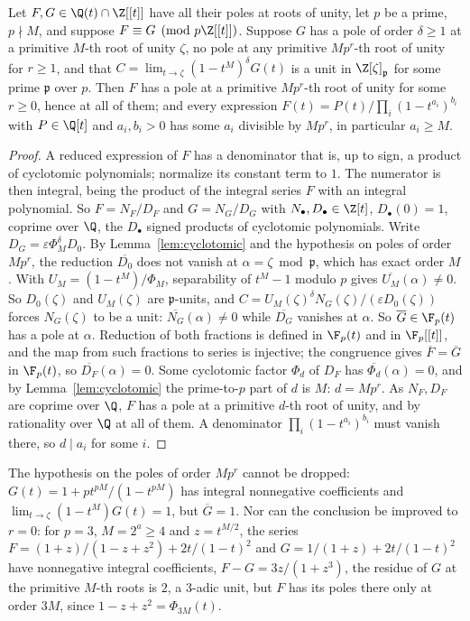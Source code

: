 \begin{theorem}\label{thm:transfer}
Let $F,G\in\Q(t)\cap\Z[[t]]$ have all their poles at roots of unity, let $p$ be
a prime, $p\nmid M$, and suppose $F\equiv G\pmod{p\Z[[t]]}$. Suppose $G$ has a
pole of order $\delta\ge1$ at a primitive $M$-th root of unity $\zeta$, no pole
at any primitive $Mp^r$-th root of unity for $r\ge1$, and that
$C=\lim_{t\to\zeta}(1-t^M)^\delta G(t)$ is a unit in $\Z[\zeta]_{\mathfrak p}$
for some prime $\mathfrak p$ over $p$. Then $F$ has a pole at a primitive
$Mp^r$-th root of unity for some $r\ge0$, hence at all of them; and every
expression $F(t)=P(t)/\prod_i(1-t^{a_i})^{b_i}$ with $P\in\Q[t]$ and $a_i,b_i>0$
has some $a_i$ divisible by $Mp^r$, in particular $a_i\ge M$.
\end{theorem}

\begin{proof}
A reduced expression of $F$ has a denominator that is, up to sign, a product
of cyclotomic polynomials; normalize its constant term to $1$. The numerator is
then integral, being the product of the integral series $F$ with an integral
polynomial. So $F=N_F/D_F$ and $G=N_G/D_G$ with $N_\bullet,D_\bullet\in\Z[t]$,
$D_\bullet(0)=1$, coprime over $\Q$, the $D_\bullet$ signed products of
cyclotomic polynomials. Write $D_G=\varepsilon\Phi_M^\delta D_0$. By
Lemma~\ref{lem:cyclotomic} and the hypothesis on poles of order $Mp^r$, the
reduction $\overline{D_0}$ does not vanish at $\alpha=\zeta\bmod\mathfrak p$,
which has exact order $M$. With $U_M=(1-t^M)/\Phi_M$, separability of
$t^M-1$ modulo $p$ gives $\overline{U_M}(\alpha)\ne0$. So $D_0(\zeta)$ and
$U_M(\zeta)$ are $\mathfrak p$-units, and
$C=U_M(\zeta)^\delta N_G(\zeta)/(\varepsilon D_0(\zeta))$ forces
$N_G(\zeta)$ to be a unit: $\overline{N_G}(\alpha)\ne0$ while
$\overline{D_G}$ vanishes at $\alpha$. So $\overline G\in\F_p(t)$ has a pole
at $\alpha$. Reduction of both fractions is defined in $\F_p(t)$ and in
$\F_p[[t]]$, and the map from such fractions to series is injective; the
congruence gives $\overline F=\overline G$ in $\F_p(t)$, so
$\overline{D_F}(\alpha)=0$. Some cyclotomic factor $\Phi_d$ of $D_F$ has
$\overline{\Phi_d}(\alpha)=0$, and by Lemma~\ref{lem:cyclotomic} the prime-to-$p$
part of $d$ is $M$: $d=Mp^r$. As $N_F,D_F$ are coprime over $\Q$, $F$ has a
pole at a primitive $d$-th root of unity, and by rationality over $\Q$ at all
of them. A denominator $\prod_i(1-t^{a_i})^{b_i}$ must vanish there, so
$d\mid a_i$ for some $i$.
\end{proof}

\begin{remark}
The hypothesis on the poles of order $Mp^r$ cannot be dropped: $G(t)=1+pt^{pM}/
(1-t^{pM})$ has integral nonnegative coefficients and $\lim_{t\to\zeta}
(1-t^M)G(t)=1$, but $\overline G=1$. Nor can the conclusion be improved to
$r=0$: for $p=3$, $M=2^a\ge4$ and $z=t^{M/2}$, the series
$F=(1+z)/(1-z+z^2)+2t/(1-t)^2$ and $G=1/(1+z)+2t/(1-t)^2$ have nonnegative
integral coefficients, $F-G=3z/(1+z^3)$, the residue of $G$ at the primitive
$M$-th roots is $2$, a $3$-adic unit, but $F$ has its poles there only at order
$3M$, since $1-z+z^2=\Phi_{3M}(t)$.
\end{remark}

